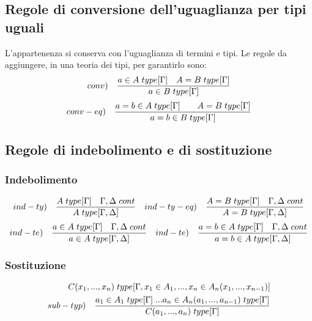 \documentclass[10pt,a4paper, italian]{book}
\begin{document}
\subsection{Regole di conversione dell'uguaglianza per tipi uguali}
\label{subsec:conversione-uguaglianza}
L'appartenenza si conserva con l'uguaglianza di termini e tipi. Le regole da aggiungere, in una teoria dei tipi, per garantirlo sono:
\[ conv) \quad \frac{a \in A\hspace{0.1cm}type[\Gamma] \quad A=B\hspace{0.1cm}type[\Gamma]}{a \in B\hspace{0.1cm}type[\Gamma]} \]
\[ conv-eq) \quad \frac{a=b \in A\hspace{0.1cm}type[\Gamma] \qquad A=B\hspace{0.1cm}type[\Gamma]}{a=b \in B\hspace{0.1cm}type[\Gamma]} \]
\subsection{Regole di indebolimento e di sostituzione}
\label{subsec:indebolimento-sostituzione}
\subsubsection{Indebolimento}
\label{subsec:indebolimento}
\[ ind-ty) \quad \frac{A\hspace{0.1cm}type[\Gamma] \quad \Gamma,\Delta\hspace{0.1cm}cont}{A\hspace{0.1cm}type[\Gamma,\Delta]} \quad ind-ty-eq) \quad \frac{A=B\hspace{0.1cm}type[\Gamma] \quad \Gamma,\Delta\hspace{0.1cm}cont}{A=B\hspace{0.1cm}type[\Gamma,\Delta]} \]
\[ ind-te) \quad \frac{a \in A\hspace{0.1cm}type[\Gamma] \quad \Gamma,\Delta\hspace{0.1cm}cont}{a \in A\hspace{0.1cm}type[\Gamma,\Delta]} \quad ind-te) \quad \frac{a=b \in A\hspace{0.1cm}type[\Gamma] \quad \Gamma,\Delta\hspace{0.1cm}cont}{a=b \in A\hspace{0.1cm}type[\Gamma,\Delta]} \]
\subsubsection{Sostituzione}
\label{subsec:sostituzione}
\begin{equation}
\begin{split}
C(x_1,...,x_n)\hspace{0.1cm}type[\Gamma, x_1 \in A_1,...,x_n \in A_n(x_1,...,x_{n-1})] \\ sub-typ) \quad \frac{a_1 \in A_1\hspace{0.1cm}type[\Gamma]\hspace{0.1cm}...a_n \in A_n(a_1,...,a_{n-1})\hspace{0.1cm}type[\Gamma]}{ C(a_1,...,a_n)\hspace{0.1cm}type[\Gamma]}
\end{split}
\end{equation}
\end{document}
